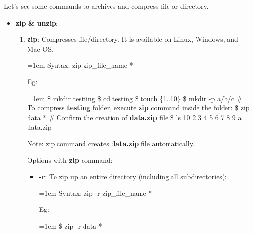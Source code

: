 \setlength{\columnsep}{3pt}
\begin{flushleft}
	Let's see some commands to archives and compress file or directory.
	\begin{itemize}
		\item \textbf{zip \& unzip}: 
		\begin{enumerate}
			\item \textbf{zip}: Compresses file/directory. It is available on Linux, Windows, and Mac OS. 
			\bigskip
			\begin{tcolorbox}[breakable,notitle,boxrule=0pt,colback=pink,colframe=pink]
				\color{black}
				\font=1em
				Syntax: zip zip\_file\_name *
				\font=4pt
			\end{tcolorbox}
			Eg:
			\begin{tcolorbox}[breakable,notitle,boxrule=-0pt,colback=black,colframe=black]
				\color{green}
				\font=1em
				\$ mkdir testiing
				\newline
				\$ cd testing
				\newline
				\$ touch \{1..10\} 
				\newline
				\$ mkdir -p a/b/c
				\newline
				\newline
				\color{yellow}
				\# To compress \textbf{testing} folder, execute \textbf{zip} command inside the folder:
				\newline
				\color{green}
				\$ zip data *
				\newline
				\newline
				\color{yellow}
				\# Confirm the creation of \textbf{data.zip} file
				\newline
				\color{green}
				\$ ls
				\color{white}
				  10  2  3  4  5  6  7  8  9  a  data.zip
				\font=4pt
			\end{tcolorbox}
			
			\bigskip
			\begin{tcolorbox}[breakable,notitle,boxrule=0pt,colback=yellow,colframe=yellow]
				\color{black}
				Note: zip command creates \textbf{data.zip} file automatically.
			\end{tcolorbox}
			
			Options with \textbf{zip} command:
			\begin{itemize}
				\item \textbf{-r}: To zip up an entire directory (including all subdirectories):
				\begin{tcolorbox}[breakable,notitle,boxrule=0pt,colback=pink,colframe=pink]
					\color{black}
					\font=1em
					Syntax: zip -r zip\_file\_name *
					\font=4pt
				\end{tcolorbox}
				Eg:
				\begin{tcolorbox}[breakable,notitle,boxrule=-0pt,colback=black,colframe=black]
					\color{green}
					\font=1em
					\$ zip -r data *
					\font=4pt
				\end{tcolorbox}
				

\end{itemize}
\end{enumerate}
\end{itemize}
\end{flushleft}
